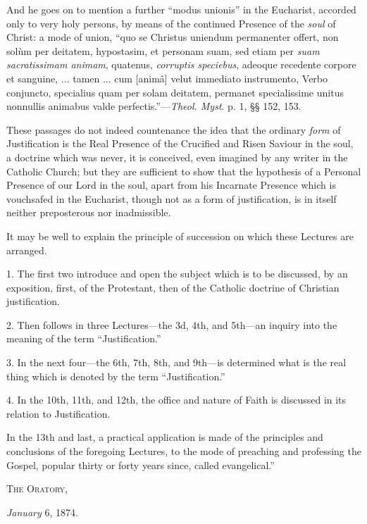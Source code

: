 And he goes on to mention a further ``modus unionis'' in
the Eucharist, accorded only to very holy persons, by means of the
continued Presence of the \emph{soul} of Christ: a mode of union,
``quo se Christus uniendum permanenter offert, non solùm per
deitatem, hypostasim, et personam suam, sed etiam per \emph{suam
sacratissimam animam}, quatenus, \emph{corruptis speciebus},
adeoque recedente corpore et sanguine, ... tamen ... cum [animâ]
velut immediato instrumento, Verbo conjuncto, specialius quam per
solam deitatem, permanet specialissime unitus nonnullis animabus
valde perfectis.''—\emph{Theol. Myst}. p. 1, §§ 152, 153.


These passages do not indeed countenance the idea that the ordinary
\emph{form} of Justification is the Real Presence of the Crucified and
Risen Saviour in the soul, a doctrine which was never, it is
conceived, even imagined by any writer in the Catholic Church; but
they are sufficient to show that the hypothesis of a Personal Presence
of our Lord in the soul, apart from his Incarnate Presence which is
vouchsafed in the Eucharist, though not as a form of justification, is
in itself neither preposterous nor inadmissible.

It may be well to explain the principle of succession on which
these Lectures are arranged.


1. The first two introduce and open the subject which is to be
discussed, by an exposition, first, of the Protestant, then of the
Catholic doctrine of Christian justification.


2. Then follows in three Lectures—the 3d, 4th, and 5th—an
inquiry into the meaning of the term ``Justification.''


3. In the next four—the 6th, 7th, 8th, and 9th—is determined
what is the real thing which is denoted by the term
``Justification.''


4. In the 10th, 11th, and 12th, the office and nature of Faith is
discussed in its relation to Justification.


In the 13th and last, a practical application is made of the
principles and conclusions of the foregoing Lectures, to the mode of
preaching and professing the Gospel, popular thirty or forty years
since, called evangelical.''


T\textsc{he} O\textsc{ratory},

\emph{January} 6, 1874.


